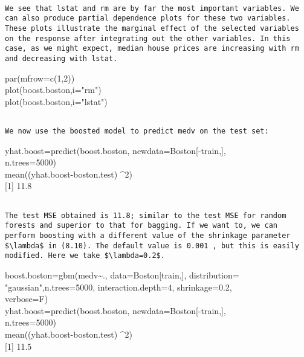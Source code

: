 \documentclass[10pt]{article}
\begin{document}
\begin{verbatim}

We see that lstat and rm are by far the most important variables. We can also produce partial dependence plots for these two variables. These plots illustrate the marginal effect of the selected variables on the response after integrating out the other variables. In this case, as we might expect, median house prices are increasing with rm and decreasing with lstat.
\end{verbatim}

\begin{displayquote}
par(mfrow=c(1,2))\\
plot(boost.boston,i="rm")\\
plot(boost.boston,i="lstat")
\end{displayquote}

\begin{verbatim}

We now use the boosted model to predict medv on the test set:
\end{verbatim}

\begin{displayquote}
yhat.boost=predict(boost.boston, newdata=Boston[-train,],\\
n.trees=5000)\\
mean((yhat.boost-boston.test) \^{}2)\\[0pt]
[1] 11.8
\end{displayquote}

\begin{verbatim}

The test MSE obtained is 11.8; similar to the test MSE for random forests and superior to that for bagging. If we want to, we can perform boosting with a different value of the shrinkage parameter $\lambda$ in (8.10). The default value is 0.001 , but this is easily modified. Here we take $\lambda=0.2$.
\end{verbatim}

\begin{displayquote}
boost.boston=gbm(medv\~{}., data=Boston[train,], distribution=\\
"gaussian",n.trees=5000, interaction.depth=4, shrinkage=0.2,\\
verbose=F)\\[0pt]
yhat.boost=predict(boost.boston, newdata=Boston[-train,],\\
n.trees=5000)\\
mean((yhat.boost-boston.test) \^{}2)\\[0pt]
[1] 11.5
\end{displayquote}
\end{document}

